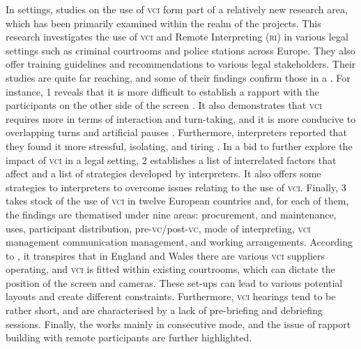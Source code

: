 \documentclass[output=paper]{langsci/langscibook}
\begin{document}
In  settings, studies on the use of \textsc{vci}  form part of a relatively new research area, which has been primarily examined within the realm of the  projects. This research investigates the use of \textsc{vci} and Remote Interpreting (\textsc{ri}) in various legal settings such as criminal courtrooms and police stations across Europe. They also offer training guidelines and recommendations to various legal stakeholders. Their studies are quite far reaching, and some of their findings confirm those in a . For instance,  1 reveals that it is more difficult to establish a rapport with the participants on the other side of the screen \citep{Rombouts2011}. It also demonstrates that \textsc{vci} requires more  in terms of interaction and turn-taking, and it is more conducive to overlapping turns and artificial pauses \citep{Balogh2011}. Furthermore, interpreters reported that they found it more stressful, isolating, and tiring \citep{Miler-Cassino2011}. In a bid to further explore the impact of \textsc{vci} in a legal setting,  2 establishes a list of interrelated factors that affect  and a list of strategies developed by interpreters. It also offers some strategies to interpreters to overcome issues relating to the use of \textsc{vci}. Finally,  3 takes stock of the use of \textsc{vci}  in twelve European countries and, for each of them, the findings are thematised under nine areas: procurement,  and maintenance, uses, participant distribution, pre-\textsc{vc}/post-\textsc{vc}, mode of interpreting, \textsc{vci} management communication management, and working arrangements. According to \citet{Braun2016a}, it transpires that in England and Wales there are various \textsc{vci}  suppliers operating, and \textsc{vci}  is fitted within existing courtrooms, which can dictate the position of the screen and cameras. These set-ups can lead to various potential layouts and create different constraints. Furthermore, \textsc{vci} hearings tend to be rather short, and are characterised by a lack of pre-briefing and debriefing sessions. Finally, the  works mainly in consecutive mode, and the issue of rapport building with remote participants are further highlighted. 
\end{document}
